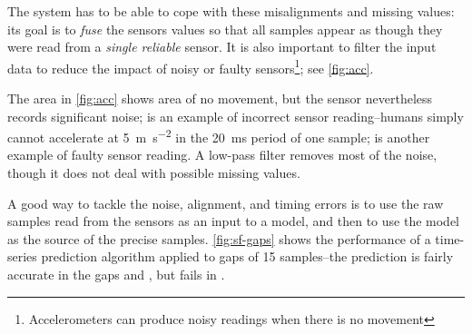 The system has to be able to cope with these misalignments and missing values: its goal is to \emph{fuse} the sensors values so that all samples appear as though they were read from a \emph{single reliable} sensor. It is also important to filter the input data to reduce the impact of noisy or faulty sensors\footnote{Accelerometers can produce noisy readings when there is no movement}; see \autoref{fig:acc}.


The area  in \autoref{fig:acc} shows area of no movement, but the sensor nevertheless records significant noise;  is an example of incorrect sensor reading--humans simply cannot accelerate at \SI{5}{\meter\second^{-2}} in the \SI{20}{\milli\second} period of one sample;  is another example of faulty sensor reading. A low-pass filter removes most of the noise, though it does not deal with possible missing values.

A good way to tackle the noise, alignment, and timing errors is to use the raw samples read from the sensors as an input to a model, and then to use the model as the source of the precise samples. \autoref{fig:sf-gaps} shows the performance of a time-series prediction algorithm applied to gaps of 15 samples--the prediction is fairly accurate in the gaps  and , but fails in .


